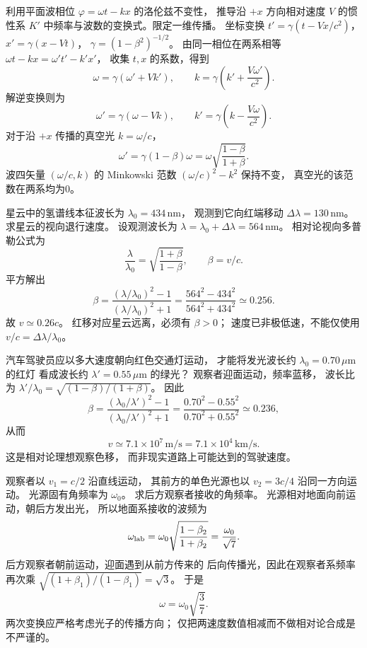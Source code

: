 利用平面波相位
$\varphi=\omega t-kx$ 的洛伦兹不变性，
推导沿 $+x$ 方向相对速度 $V$ 的惯性系
$K'$ 中频率与波数的变换式。限定一维传播。
\exsolution
坐标变换
$t'=\gamma(t-Vx/c^2)$，
$x'=\gamma(x-Vt)$，
$\gamma=(1-\beta^2)^{-1/2}$。
由同一相位在两系相等
$\omega t-kx=\omega't'-k'x'$，
收集 $t,x$ 的系数，得到
\[
 \omega=\gamma(\omega'+Vk'),\qquad
 k=\gamma\left(k'+\frac{V\omega'}{c^2}\right).
\]
解逆变换则为
\[
 \boxed{\omega'=\gamma(\omega-Vk)},\qquad
 \boxed{k'=\gamma\left(k-\frac{V\omega}{c^2}\right)}.
\]
对于沿 $+x$ 传播的真空光 $k=\omega/c$，
\[
 \boxed{\omega'=\gamma(1-\beta)\omega
 =\omega\sqrt{\frac{1-\beta}{1+\beta}}}.
\]
\excheck 波四矢量
$(\omega/c,k)$ 的 Minkowski 范数
$(\omega/c)^2-k^2$ 保持不变，
真空光的该范数在两系均为0。

星云中的氢谱线本征波长为
$\lambda_0=434\,\mathrm{nm}$，
观测到它向红端移动
$\Delta\lambda=130\,\mathrm{nm}$。
求星云的视向退行速度。
\exsolution
设观测波长为
$\lambda=\lambda_0+\Delta\lambda=564\,\mathrm{nm}$。
相对论视向多普勒公式为
\[
 \frac{\lambda}{\lambda_0}
 =\sqrt{\frac{1+\beta}{1-\beta}},
 \qquad \beta=v/c.
\]
平方解出
\[
 \boxed{\beta=
 \frac{(\lambda/\lambda_0)^2-1}
 {(\lambda/\lambda_0)^2+1}}
 =\frac{564^2-434^2}{564^2+434^2}
 \simeq0.256.
\]
故 $\boxed{v\simeq0.26c}$。
\excheck 红移对应星云远离，必须有 $\beta>0$；
速度已非极低速，不能仅使用 $v/c=\Delta\lambda/\lambda_0$。

汽车驾驶员应以多大速度朝向红色交通灯运动，
才能将发光波长约
$\lambda_0=0.70\,\mu\mathrm m$ 的红灯
看成波长约
$\lambda'=0.55\,\mu\mathrm m$ 的绿光？
\exsolution
观察者迎面运动，频率蓝移，
波长比为
$\lambda'/\lambda_0=\sqrt{(1-\beta)/(1+\beta)}$。
因此
\[
 \boxed{\beta=
 \frac{(\lambda_0/\lambda')^2-1}
 {(\lambda_0/\lambda')^2+1}
 =\frac{0.70^2-0.55^2}{0.70^2+0.55^2}
 \simeq0.236},
\]
从而
\[
 \boxed{v\simeq7.1\times10^7\,\mathrm{m/s}
 =7.1\times10^4\,\mathrm{km/s}}.
\]
\excheck 这是相对论理想观察色移，
而非现实道路上可能达到的驾驶速度。

观察者以 $v_1=c/2$ 沿直线运动，
其前方的单色光源也以
$v_2=3c/4$ 沿同一方向运动。
光源固有角频率为 $\omega_0$。
求后方观察者接收的角频率。
\exsolution
光源相对地面向前运动，朝后方发出光，
所以地面系接收的波频为
\[
 \omega_{\rm lab}=\omega_0
 \sqrt{\frac{1-\beta_2}{1+\beta_2}}
 =\frac{\omega_0}{\sqrt7}.
\]
后方观察者朝前运动，迎面遇到从前方传来的
后向传播光，因此在观察者系频率再次乘
$\sqrt{(1+\beta_1)/(1-\beta_1)}=\sqrt3$。
于是
\[
 \boxed{\omega=\omega_0\sqrt{\frac37}}.
\]
\excheck 两次变换应严格考虑光子的传播方向；
仅把两速度数值相减而不做相对论合成是不严谨的。

